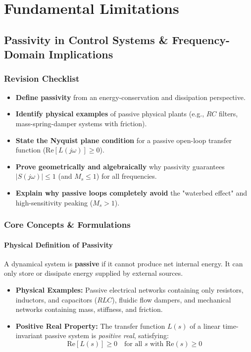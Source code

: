 \documentclass[12pt,onecolumn,twoside ]{article}
\begin{document}
	\newpage
	\section{Fundamental Limitations}

	
	\subsection{Passivity in Control Systems \& Frequency-Domain Implications}
	\subsubsection{Revision Checklist}
	\begin{itemize}
		\item[$\square$]
		\textbf{Define passivity} from an energy-conservation and dissipation perspective.
		\item[$\square$]
		\textbf{Identify physical examples} of passive physical plants (e.g., $RC$ filters, mass-spring-damper systems with friction).
		\item[$\square$]
		\textbf{State the Nyquist plane condition} for a passive open-loop transfer function ($\text{Re}[L(j\omega)] \ge 0$).
		\item[$\square$]
		\textbf{Prove geometrically and algebraically} why passivity guarantees $|S(j\omega)| \le 1$ (and $M_s \le 1$) for all frequencies.
		\item[$\square$]
		\textbf{Explain why passive loops completely avoid} the "waterbed effect" and high-sensitivity peaking ($M_s > 1$).
	\end{itemize}
	
	\subsubsection{Core Concepts \& Formulations}
	\paragraph{Physical Definition of Passivity}
	A dynamical system is \textbf{passive} if it cannot produce net internal energy. It can only store or dissipate energy supplied by external sources.
	\begin{itemize}
		\item
		\textbf{Physical Examples:} Passive electrical networks containing only resistors, inductors, and capacitors ($RLC$), fluidic flow dampers, and mechanical networks containing mass, stiffness, and friction.
		\item
		\textbf{Positive Real Property:} The transfer function $L(s)$ of a linear time-invariant passive system is \textit{positive real}, satisfying: \[
		\text{Re}[L(s)] \ge 0 \quad \text{for all } s \text{ with } \text{Re}(s) \ge 0
		\]
	\end{itemize}
\end{document}
